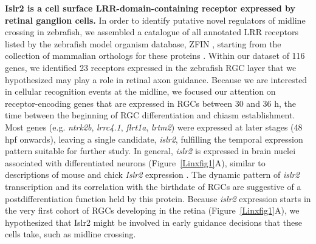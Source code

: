 \noindent\textbf{Islr2 is a cell surface LRR-domain-containing receptor expressed by retinal ganglion cells.}\newline
\indent In order to identify putative novel regulators of midline crossing in zebrafish, we assembled a catalogue of all annotated LRR receptors listed by the zebrafish model organism database, ZFIN \cite{bradford2011zfin}, starting from the collection of mammalian orthologs for these proteins \cite{dolan2007extracellular}.
Within our dataset of 116 genes, we identified 23 receptors expressed in the zebrafish RGC layer that we hypothesized may play a role in retinal axon guidance.
Because we are interested in cellular recognition events at the midline, we focused our attention on receptor-encoding genes that are expressed in RGCs between 30 and 36 h, the time between the beginning of RGC differentiation and chiasm establishment.
Most genes (e.g. \emph{ntrk2b}, \emph{lrrc4.1}, \emph{flrt1a}, \emph{lrtm2}) were expressed at later stages (48 hpf onwards), leaving a single candidate, \emph{islr2}, fulfilling the temporal expression pattern suitable for further study.
In general, \emph{islr2} is expressed in brain nuclei associated with differentiated neurons (Figure~\ref{Linxfig1}A), similar to descriptions of mouse and chick \emph{Islr2} expression \cite{gejima2006lrr,homma2009expression}.
The dynamic pattern of \emph{islr2} transcription and its correlation with the birthdate of RGCs are suggestive of a postdifferentiation function held by this protein.
Because \emph{islr2} expression starts in the very first cohort of RGCs developing in the retina (Figure~\ref{Linxfig1}A), we hypothesized that Islr2 might be involved in early guidance decisions that these cells take, such as midline crossing.
